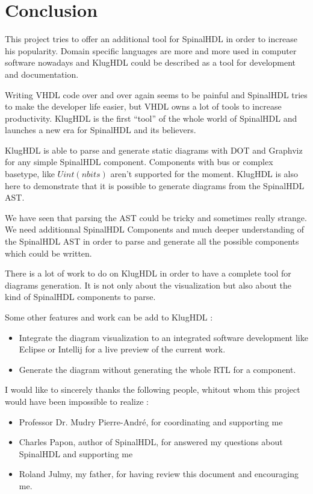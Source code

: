 \chapter{Conclusion}
\label{cha:Conclusion}

This project tries to offer an additional tool for SpinalHDL in order to
increase his popularity. Domain specific languages are more and more used in
computer software nowadays and KlugHDL could be described as a tool for
development and documentation.

Writing VHDL code over and over again seems to be painful and SpinalHDL tries to
make the developer life easier, but VHDL owns a lot of tools to increase
productivity. KlugHDL is the first ``tool'' of the whole world of SpinalHDL and
launches a new era for SpinalHDL and its believers.

KlugHDL is able to parse and generate static diagrams with DOT and Graphviz for
any simple SpinalHDL component. Components with bus or complex basetype, like
$Uint(n bits)$ aren't supported for the moment. KlugHDL is also here to
demonstrate that it is possible to generate diagrams from the SpinalHDL AST.

We have seen that parsing the AST could be tricky and sometimes really strange.
We need additionnal SpinalHDL Components and much deeper understanding of the
SpinalHDL AST in order to parse and generate all the possible components which
could be written.

There is a lot of work to do on KlugHDL in order to have a complete tool for
diagrams generation. It is not only about the visualization but also about the
kind of SpinalHDL components to parse.

Some other features and work can be add to KlugHDL :
\begin{itemize}
\item Integrate the diagram visualization to an integrated software development
  like Eclipse or Intellij for a live preview of the current work.
\item Generate the diagram without generating the whole RTL for a component.
\end{itemize}

I would like to sincerely thanks the following people, whitout whom this project
would have been impossible to realize :

\begin{itemize}
\item Professor Dr. Mudry Pierre-André, for coordinating and supporting me
\item Charles Papon, author of SpinalHDL, for answered my questions about
  SpinalHDL and supporting me
\item Roland Julmy, my father, for having review this document and encouraging me.
\end{itemize}

